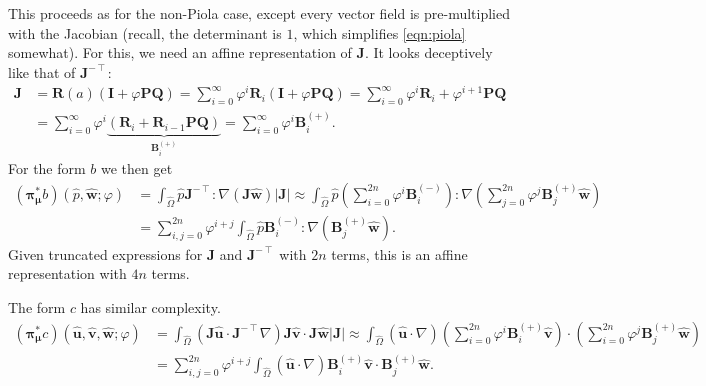 \documentclass[onecolumn, twoside, a4paper, 11pt]{article}
\begin{document}
This proceeds as for the non-Piola case, except every vector field is pre-multiplied with the
Jacobian (recall, the determinant is $1$, which simplifies \eqref{eqn:piola} somewhat). For this, we
need an affine representation of $\bm J$. It looks deceptively like that of $\bm J^{-\intercal}$:
\begin{align}
  \nonumber
  \bm J
  &= \bm R(a) (\bm I + \varphi \bm P \bm Q)
  = \sum_{i=0}^\infty \varphi^i \bm R_i (\bm I + \varphi \bm P \bm Q)
  = \sum_{i=0}^\infty \varphi^i \bm R_i + \varphi^{i+1} \bm P \bm Q \\
  &= \sum_{i=0}^\infty
    \varphi^i \underbrace{\left(
    \bm R_i + \bm R_{i-1} \bm P \bm Q
    \right)}_{\bm B^{(+)}_i} = \sum_{i=0}^\infty \varphi^i \bm B^{(+)}_i.
\end{align}
For the form $b$ we then get
\begin{align}
  \nonumber
  ({\bm\pi}^*_{\bm\mu}b)(
    \hat{p},
    \hat{\bm w};
    \varphi
  ) &= \int_{\hat{\Omega}} \hat{p} \bm J^{-\intercal} : \nabla (\bm J \hat{\bm w}) |\bm J|
    \approx \int_{\hat{\Omega}} \hat{p}
      \left( \sum_{i=0}^{2n} \varphi^i \bm B^{(-)}_i \right) : \nabla
      \left( \sum_{j=0}^{2n} \varphi^j \bm B^{(+)}_j \hat{\bm w} \right) \\
    &= \sum_{i,j=0}^{2n} \varphi^{i+j}
      \int_{\hat{\Omega}} \hat{p} \bm B^{(-)}_i :
      \nabla \left( \bm B^{(+)}_j \hat{\bm w} \right).
\end{align}
Given truncated expressions for $\bm J$ and $\bm J^{-\intercal}$ with $2n$
terms, this is an affine representation with $4n$ terms.

The form $c$ has similar complexity.
\begin{align}
  \nonumber
  ({\bm\pi}^*_{\bm\mu}c)(
    \hat{\bm u},
    \hat{\bm v},
    \hat{\bm w};
    \varphi
  )
  &= \int_{\hat{\Omega}} (\bm J \hat{\bm u} \cdot \bm J^{-\intercal}\nabla)
    \bm J \hat{\bm v} \cdot \bm J \hat{\bm w} |\bm J|
  \approx \int_{\hat{\Omega}} (\hat{\bm u} \cdot \nabla)
      \left( \sum_{i=0}^{2n} \varphi^i \bm B^{(+)}_i \hat{\bm v} \right) \cdot
    \left( \sum_{i=0}^{2n} \varphi^j \bm B^{(+)}_j \hat{\bm w} \right) \\
  &= \sum_{i,j=0}^{2n} \varphi^{i+j}
    \int_{\hat{\Omega}} (\hat{\bm u} \cdot \nabla) \bm B^{(+)}_i \hat{\bm v} \cdot \bm B^{(+)}_j \hat{\bm w}.
\end{align}
\end{document}
